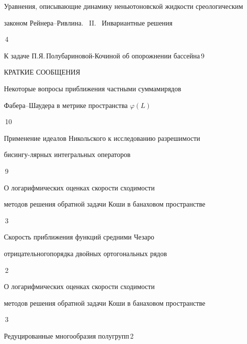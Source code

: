 

{Уравнения, описывающие динамику неньютоновской жидкости с\newline реологическим 


законом Рейнера--Ривлина. \ II. \ Инвариантные решения}{\No\,4}




{К задаче П.Я.\,Полубариновой-Кочиной об опорожнении бассейна}{\No\,9}








\bigskip


{\centerline {КРАТКИЕ СООБЩЕНИЯ}}


\bigskip







{Некоторые вопросы приближения частными суммами\newline рядов


Фабера--Шаудера в метрике пространства $\varphi(L)$}{\No\,10}




{Применение идеалов Никольского к исследованию разрешимости 


бисингу-\newline лярных интегральных операторов}{\No\,9}




{О логарифмических оценках скорости сходимости \newline


методов решения обратной задачи Коши в банаховом пространстве}{\No\,3}




{Скорость приближения функций средними Чезаро


отрицательного\newline порядка двойных ортогональных рядов}{\No\,2}




{О логарифмических оценках скорости сходимости \newline


методов решения обратной задачи Коши в банаховом пространстве}{\No\,3}




{Редуцированные многообразия полугрупп}{\No\,2}


